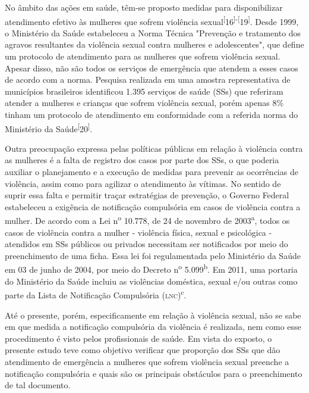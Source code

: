 \documentclass{article}
\begin{document}
No âmbito das ações em saúde, têm-se proposto medidas para disponibilizar
atendimento efetivo às mulheres que sofrem violência
sexual\textsuperscript{[}16\textsuperscript{]}\textsuperscript{-}\textsuperscript{[}19\textsuperscript{]}. Desde 1999, o Ministério da Saúde estabeleceu a Norma Técnica "Prevenção e
tratamento dos agravos resultantes da violência sexual contra mulheres e
adolescentes", que define um protocolo de atendimento para as mulheres que
sofrem violência sexual. Apesar disso, não são todos os serviços de emergência
que atendem a esses casos de acordo com a norma. Pesquisa realizada em uma
amostra representativa de municípios brasileiros identificou 1.395 serviços de
saúde (SSs) que referiram atender a mulheres e crianças que sofrem violência
sexual, porém apenas 8\% tinham um protocolo de atendimento em conformidade com
a referida norma do Ministério da Saúde\textsuperscript{[}20\textsuperscript{]}.

Outra preocupação expressa pelas políticas públicas em relação à violência
contra as mulheres é a falta de registro dos casos por parte dos SSs, o que
poderia auxiliar o planejamento e a execução de medidas para prevenir as
ocorrências de violência, assim como para agilizar o atendimento às vítimas. No
sentido de suprir essa falta e permitir traçar estratégias de prevenção, o
Governo Federal estabeleceu a exigência de notificação compulsória em casos de
violência contra a mulher. De acordo com a Lei n\textsuperscript{o}
10.778, de 24 de novembro de 2003\textsuperscript{a}, todos os casos de violência contra a mulher - violência física, sexual e
psicológica - atendidos em SSs públicos ou privados necessitam ser notificados
por meio do preenchimento de uma ficha. Essa lei foi regulamentada pelo
Ministério da Saúde em 03 de junho de 2004, por meio do Decreto
n\textsuperscript{o}
5.099\textsuperscript{b}. Em 2011, uma portaria do Ministério da Saúde incluiu as violências doméstica,
sexual e/ou outras como parte da Lista de Notificação Compulsória
(\textsc{lnc})\textsuperscript{c}.

Até o presente, porém, especificamente em relação à violência sexual, não se
sabe em que medida a notificação compulsória da violência é realizada, nem como
esse procedimento é visto pelos profissionais de saúde. Em vista do exposto, o
presente estudo teve como objetivo verificar que proporção dos SSs que dão
atendimento de emergência a mulheres que sofrem violência sexual preenche a
notificação compulsória e quais são os principais obstáculos para o
preenchimento de tal documento.
\end{document}
